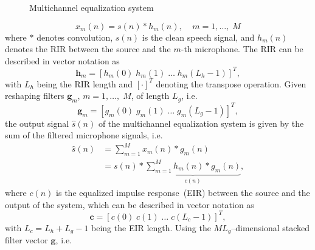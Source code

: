 \documentclass[10pt]{IEEEtran}
\begin{document}
\begin{figure}[b]
  \caption{Multichannel equalization system}
  \label{fig: acsys}
\end{figure}
\begin{equation}
  x_m(n) =  s(n)  \ast h_m(n), \; \; \; \; m = 1, \ldots, \; M
\end{equation}
where $\ast$ denotes convolution, $s(n)$ is the clean speech signal, and $h_m(n)$ denotes the RIR between the source and the $m$-th microphone.
The RIR can be described in vector notation as
\begin{equation}
  \mathbf{h}_m = \left[h_m(0) \; h_m(1) \; \ldots \; h_m(L_h-1) \right]^T,
\end{equation}
with $L_h$ being the RIR length and $\left[\cdot \right]^T$ denoting the transpose operation.
Given reshaping filters $\mathbf{g}_m$, $m = 1, \ldots, \; M$, of length $L_g$, i.e.
\begin{equation}
\mathbf{g}_m = \left[g_m(0) \; g_m(1) \; \ldots \; g_m(L_g-1) \right]^T,
\end{equation}
the output signal $\hat{s}(n)$ of the multichannel equalization system is given by the sum of the filtered microphone signals, i.e.
\begin{align}
  \hat{s}(n) &= \sum_{m=1}^{M} x_m(n) \ast g_m(n) \\
  & =  s(n) \ast \underbrace{\sum_{m=1}^{M} h_m(n) \ast g_m(n)}_{c(n)},
\end{align}
where $c(n)$ is the equalized impulse response~(EIR) between the source and the output of the system, which can be described in vector notation as
\begin{equation}
\mathbf{c} = \left[c(0) \; c(1) \; \ldots \; c(L_c-1) \right]^{T},
\end{equation}
with $L_c = L_h+L_g-1$ being the EIR length.
Using the $ML_g$--dimensional stacked filter vector $\mathbf{g}$, i.e.
\end{document}
